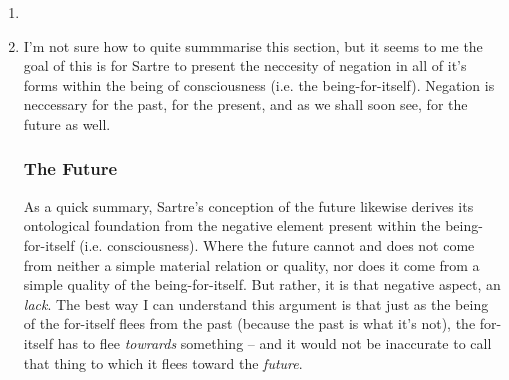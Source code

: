 \begin{enumerate}
  \item {}
  \item I'm not sure how to quite summmarise this section, but it seems to me the goal of this is for Sartre to present the neccesity of negation in all of it's forms within the being of consciousness (i.e. the being-for-itself). Negation is neccessary for the past, for the present, and as we shall soon see, for the future as well.

  \subsubsection*{The Future}
  As a quick summary, Sartre's conception of the future likewise derives its ontological foundation from the negative element present within the being-for-itself (i.e. consciousness). Where the future cannot and does not come from neither a simple material relation or quality, nor does it come from a simple quality of the being-for-itself. But rather, it is that negative aspect, an \emph{lack}. The best way I can understand this argument is that just as the being of the for-itself flees from the past (because the past is what it's not), the for-itself has to flee \emph{towrards} something -- and it would not be inaccurate to call that thing to which it flees toward the \emph{future}.


\end{enumerate}
